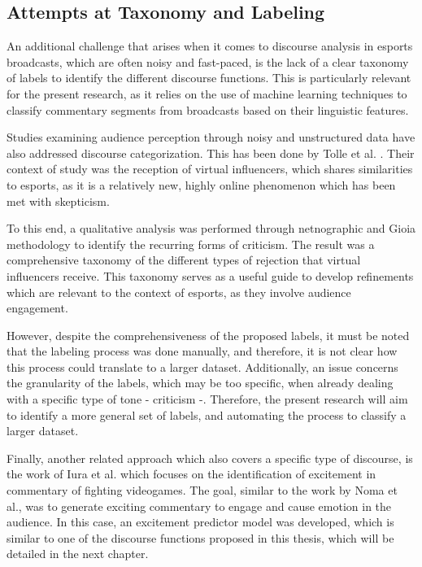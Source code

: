 \subsection{Attempts at Taxonomy and Labeling}

An additional challenge that arises when it comes to discourse analysis in esports broadcasts, which are often noisy and fast-paced, is the lack of a clear taxonomy of labels to identify the different discourse functions. This is particularly relevant for the present research, as it relies on the use of machine learning techniques to classify commentary segments from broadcasts based on their linguistic features.

\medskip

Studies examining audience perception through noisy and unstructured data have also addressed discourse categorization. This has been done by Tolle et al. \cite{tolle2025disentangling}. Their context of study was the reception of virtual influencers, which shares similarities to esports, as it is a relatively new, highly online phenomenon which has been met with skepticism. 

\medskip 

To this end, a qualitative analysis was performed through netnographic and Gioia methodology to identify the recurring forms of criticism. The result was a comprehensive taxonomy of the different types of rejection that virtual influencers receive. This taxonomy serves as a useful guide to develop refinements which are relevant to the context of esports, as they involve audience engagement. 

\medskip

However, despite the comprehensiveness of the proposed labels, it must be noted that the labeling process was done manually, and therefore, it is not clear how this process could translate to a larger dataset. Additionally, an issue concerns the granularity of the labels, which may be too specific, when already dealing with a specific type of tone - criticism -. Therefore, the present research will aim to identify a more general set of labels, and automating the process to classify a larger dataset. 

\medskip 

Finally, another related approach which also covers a specific type of discourse, is the work of Iura et al. \cite{iura2025excitement} which focuses on the identification of excitement in commentary of fighting videogames. The goal, similar to the work by Noma et al., was to generate exciting commentary to engage and cause emotion in the audience. In this case, an excitement predictor model was developed, which is similar to one of the discourse functions proposed in this thesis, which will be detailed in the next chapter. 

